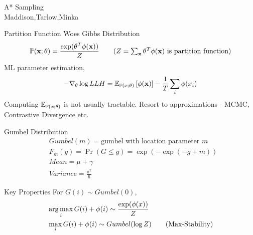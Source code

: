 \begin{frame}
  \begin{center}
    {\huge A* Sampling
    } \\
    Maddison,Tarlow,Minka
  \end{center}
\end{frame}



\begin{frame}{Partition Function Woes}
  Gibbs Distribution
  \begin{align*}
    \Pr(\x;\theta) =\frac{\exp(\theta^T\phi(\x))}{Z} \tag{$Z=\sum_{\x} \theta^T\phi(\x)$ is partition function}
  \end{align*}
  ML parameter estimation,
  \begin{align*}
    - \nabla_\theta \log LLH = \operatorname{\mathbb{E}}_{\mathbb{P}(x;\theta)}\left[\phi(\operatorname{\mathbf{x}})\right] - \frac{1}{T} \sum_i\phi(x_i)
  \end{align*}
  Computing $\operatorname{\mathbb{E}}_{\mathbb{P}(x;\theta)}$ is not usually tractable. Resort to approximations - MCMC, Contrastive Divergence etc.
\end{frame}

\begin{frame}{Gumbel Distribution}
  \begin{align*}
    & Gumbel(m) = \text{gumbel with location parameter $m$}\\
    & F_m(g) = \Pr(G\le g) = \exp(-\exp(-g+m)) \tag{CDF for $Gumbel(m)$}\\
    & Mean = \mu+\gamma \tag{a fixed offset away from location parameter} \\
    & Variance = \frac{\pi^2}{6}
  \end{align*}
\end{frame}

\begin{frame}{Key Properties}
  For $G(i) \sim Gumbel(0)$,
  \begin{align*}
    & \operatorname*{{arg\,max}}_i{G(i)+\phi(i)} \sim \frac{\exp(\phi(x))}{Z} \\
    & \max_i{G(i)+\phi(i)} \sim Gumbel(\log Z) \tag{Max-Stability}
  \end{align*}
\end{frame}

